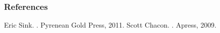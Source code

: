 \documentclass{beamer}
\begin{document}
\begin{frame}[allowframebreaks]
  \frametitle<presentation>{References}    
  \begin{thebibliography}{10}    
  \beamertemplatebookbibitems
    Eric Sink.
    .
    \newblock Pyrenean Gold Press, 2011.
    Scott Chacon.
    .
    \newblock Apress, 2009.
  \end{thebibliography}
\end{frame}
\end{document}
